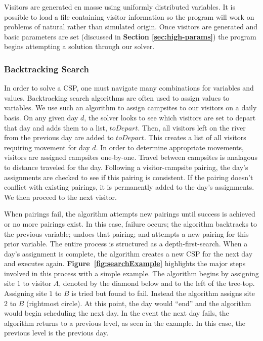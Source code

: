 \documentclass[11pt]{article} %
\begin{document}
Visitors are generated en masse using uniformly distributed
variables.  It is possible to load a file containing visitor information
so the program will work on problems of natural rather than simulated
origin.  Once visitors are generated and basic parameters
are set (discussed in \textbf{Section \ref{sec:high-params}}) the program begins
attempting a solution through our solver.

\subsubsection{Backtracking Search}
In order to solve a CSP, one must navigate many combinations
for variables and values. Backtracking search algorithms are often used
to assign values to variables\cite{AI-Intro}.  We use such an algorithm to
assign campsites to our  visitors on a daily basis.
On any given day
$d$, the solver looks to see which visitors are set to depart that day and
adds them to a list, $toDepart$.  Then, all visitors left on the
river from the previous day are added to $toDepart$.  This creates a list of all
 visitors requiring movement for day $d$.  In order to determine
appropriate movements, visitors are assigned campsites one-by-one.  Travel
between campsites is analagous to
distance traveled for the day.  Following
a visitor-campsite pairing, the day's assignments are checked to see if this pairing is
consistent.  If the pairing doesn't conflict with
existing pairings, it is permanently added to the day's assignments.
We then proceed to the next visitor.

When pairings fail, the algorithm attempts new pairings
until success is achieved or no more pairings exist.  In this case,  failure occurs;
the algorithm backtracks to the previous variable; undoes that pairing; and
attempts a new pairing for this prior variable.  The entire process is structured as a
depth-first-search. When a day's assignment is complete, the algorithm creates
a new CSP for the next day and executes again.  \textbf{Figure~\ref{fig:searchExample}}
highlights the major steps
involved in this process with a simple example.  The algorithm begins by
assigning site $1$ to visitor $A$, denoted
by the diamond below and to the left of the tree-top.  Assigning
site $1$ to $B$ is tried but found to fail.  Instead the algorithm assigns site
$2$ to $B$ (rightmost circle).  At this point, the day would ``end'' and
the algorithm would begin scheduling the next day.  In the event
the next day fails, the algorithm returns to a previous level, as
seen in the example.  In this case, the previous level is the previous day.
\end{document}
